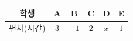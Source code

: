 {\renewcommand{\arraystretch}{1.35}\small
\begin{tabular}{|c|c|c|c|c|c|}
\hline
학생 & A & B & C & D & E \\ \hline
편차(시간) & $3$ & $-1$ & $2$ & $x$ & $1$ \\ \hline
\end{tabular}}

